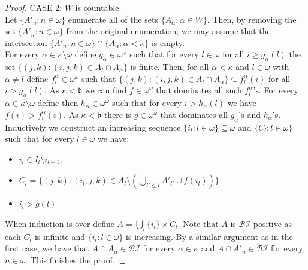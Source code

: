\documentclass[10pt,a4paper]{amsart}
\newcommand{\BI}{\mathcal{BI}}
\newcommand{\Baire}{\omega^{\omega}}
\newcommand{\bbb}{\mathfrak{b}}
\begin{document}
\begin{proof}
    CASE 2: $W$ is countable.\\
    Let $\{A'_{n}:n\in\omega\}$ enumerate all of the sets $\{A_{\alpha}:\alpha\in W\}$. Then, by removing the set $\{A'_{n}:n\in\omega\}$ from the original enumeration, we may assume that the intersection $\{A'_{n}:n\in\omega\}\cap\{A_{\alpha}:\alpha<\kappa\}$ is empty.\\
    For every $\alpha\in\kappa\setminus\omega$ define $g_{\alpha}\in\Baire$ such that for every $l\in\omega$ for all $i\geq g_{\alpha}(l)$ the set $\{(j,k):(i,j,k)\in A_{l}\cap A_{\alpha}\}$ is finite. Then, for all $\alpha<\kappa$ and $l\in\omega$ with $\alpha\neq l$ define $f^{\alpha}_{l}\in\Baire$ such that $\{(j,k):(i,j,k)\in A_{l}\cap A_{\alpha}\}\subseteq f^{\alpha}_{l}(i)$ for all $i>g_{\alpha}(l)$.
    As $\kappa<\bbb$ we can find $f\in\Baire$ that dominates all such $f^{\alpha}_{l}$'s.
    For every $\alpha\in\kappa\setminus\omega$ define then $h_{\alpha}\in\Baire$ such that for every $i>h_{\alpha}(l)$ we have $f(i)>f^{\alpha}_{l}(i)$. As $\kappa<\bbb$ there is $g\in\Baire$ that dominates all $g_{\alpha}$'s and $h_{\alpha}$'s.\\
    Inductively we construct an increasing sequence $\{i_{l}:l\in\omega\}\subseteq\omega$ and $\{C_{l}:l\in\omega\}$ such that for every $l\in\omega$ we have:
    \begin{itemize}
        \item[--] $i_{l}\in I_{l}\setminus i_{l-1}$,
        \item[--] $C_{l}=\{(j,k):(i_{l},j,k)\in A_{l}\setminus(\bigcup_{l'\leq l}A'_{l'}\cup f(i_{l}))\}$
        \item[--] $i_{l}>g(l)$
    \end{itemize}
    When induction is over define $A=\bigcup_{l}\{i_{l}\}\times C_{l}$. Note that $A$ is $\BI$-positive as each $C_{l}$ is infinite and $\{i_{l}:l\in\omega\}$ is increasing. By a similar argument as in the first case, we have that $A\cap A_{\alpha}\in\BI$ for every $\alpha\in\kappa$ and $A\cap A'_{n}\in\BI$ for every $n\in\omega$. This finishes the proof.
\end{proof}
\end{document}
